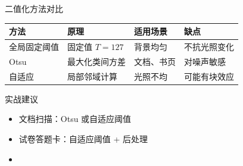 \begin{frame}{二值化方法对比}
    \begin{table}
        \centering
        \begin{tabular}{p{2.5cm}p{3cm}p{4cm}p{2cm}}
            \toprule
            \textbf{方法} & \textbf{原理} & \textbf{适用场景} & \textbf{缺点} \\
            \midrule
            全局固定阈值 & 固定值 $T=127$ & 背景均匀 & 不抗光照变化 \\
            Otsu & 最大化类间方差 & 文档、书页 & 对噪声敏感 \\
            自适应 & 局部邻域计算 & 光照不均 & 可能有块效应 \\
            \bottomrule
        \end{tabular}
    \end{table}

    \begin{alertblock}{实战建议}
        \begin{itemize}
            \item 文档扫描：Otsu 或自适应阈值
            \item 试卷答题卡：自适应阈值 + 后处理
            \item {}
        \end{itemize}
    \end{alertblock}
\end{frame}

